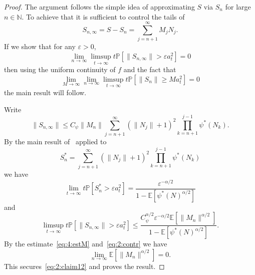 \documentclass[preprint,12pt]{elsarticle}
\theoremstyle{definition}
\theoremstyle{remark}
\newcommand{\Mbf}{{ M}}
\newcommand{\Nbf}{{ N}}
\newcommand{\Sbf}{{ S}}
\newcommand{\eps}{{\varepsilon}}
\newcommand{\1}{{\mathbf 1}}
\renewcommand{\P}{\mathbb{P}}
\numberwithin{equation}{section}
\newcommand{\Ebb}{\mathbb{E}}  %
\newcommand{\E}{\mathbb{E}}  %
\newcommand{\Pbb}{\mathbb{P}}
\begin{document}
\begin{proof}
	The argument follows the simple idea of approximating $\Sbf$ via $\Sbf_n$ for large $n \in \mathbb{N}$.
	To achieve that it is sufficient to control the tails of
	\begin{equation*}
		\Sbf_{n, \infty} = \Sbf-\Sbf_n=\sum_{j=n+1}^\infty \Mbf_j\Nbf_j.
	\end{equation*}
	If we show that for any $\varepsilon>0$,
        \begin{equation}\label{eq:2:claim12}
			\lim_{n \to \infty} \limsup_{t \to \infty} t \Pbb\left[\| \Sbf_{n,\infty} \| > \eps a_t^2\right] =0	
	\end{equation}
	then using the uniform continuity of $f$ and the fact that 
        \begin{equation*}
            \lim_{M \to \infty} \lim_{n\to \infty} \limsup_{t\to \infty} t \P \left[\|\Sbf_n\| \ge M a_t^2 \right] = 0
        \end{equation*}
        the main result will follow.
        
        Write
	\begin{equation*}
		\|\Sbf_{n, \infty}\| \leq 
		C_\psi\|\Mbf_n\|\sum_{j=n+1}^\infty (\|\Nbf_j\|+1)^2 \prod_{k=n+1}^{j-1} \psi^*(\Nbf_k).
	\end{equation*}
	By the main result of~\cite{grey1994regular} applied to 
        \begin{equation*}
            \Sbf^*_n = \sum_{j=n+1}^\infty (\|\Nbf_j\|+1)^2 \prod_{k=n+1}^{j-1} \psi^*(\Nbf_k)
        \end{equation*}
        we have
        \begin{equation*}
		\lim_{t\to \infty} t\P [\Sbf^*_n > \eps a_t^2] = \frac{\eps^{-\alpha/2}}{1 - \E [\psi^*(\Nbf)^{\alpha/2}]}
        \end{equation*}
        and
		\begin{equation*}
			\limsup_{t \to \infty} t \Pbb\left[\| \Sbf_{n,\infty} \| > \eps a_t^2\right] 
			\le \frac{C_\psi^{\alpha/2}\eps^{-\alpha / 2} \Ebb[ \| \Mbf_n\|^{\alpha/2}] }{ 1-\Ebb[\psi^*(\Nbf)^{\alpha/2}]}.
		\end{equation*}
		By the estimate~\eqref{eq:4:estM} and~\eqref{eq:2:contr} we have
		\begin{equation*}
			\lim_{n \to \infty} \Ebb\left[ \|\Mbf_n\|^{\alpha/2} \right] =0.
		\end{equation*}
		This secures~\eqref{eq:2:claim12} and proves the result.
	\end{proof}
\end{document}

